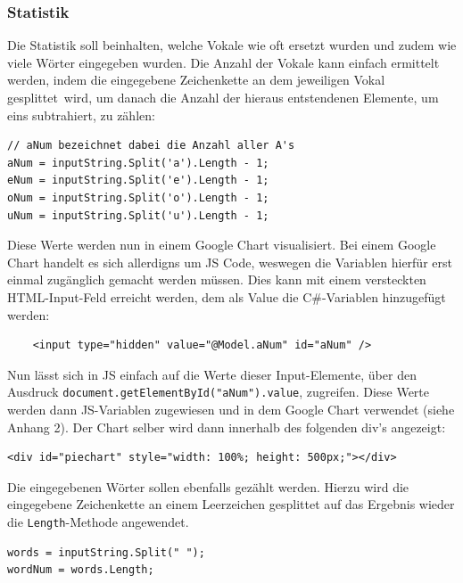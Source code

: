 \documentclass[a4paper,
12pt,
oneside]
{article}
\newcommand{\sPar}{\par\vspace*{6pt}}
\begin{document}
	 \subsubsection{Statistik}
	 Die Statistik soll beinhalten, welche Vokale wie oft ersetzt wurden und zudem wie viele Wörter eingegeben wurden. Die Anzahl der Vokale kann einfach ermittelt werden, indem die eingegebene Zeichenkette an dem jeweiligen Vokal \glqq gesplittet\grqq~wird, um danach die Anzahl der hieraus entstendenen Elemente, um eins subtrahiert, zu zählen:
	 \lstset{style=csharp}
	 \begin{lstlisting}
// aNum bezeichnet dabei die Anzahl aller A's
aNum = inputString.Split('a').Length - 1;
eNum = inputString.Split('e').Length - 1;
oNum = inputString.Split('o').Length - 1;
uNum = inputString.Split('u').Length - 1;
	 \end{lstlisting}
	 Diese Werte werden nun in einem Google Chart visualisiert. Bei einem Google Chart handelt es sich allerdigns um JS Code, weswegen die Variablen hierfür erst einmal zugänglich gemacht werden müssen. Dies kann mit einem versteckten HTML-Input-Feld erreicht werden, dem als Value die C\#-Variablen hinzugefügt werden:
	\lstset{style=cshtml}
	\begin{lstlisting}
	<input type="hidden" value="@Model.aNum" id="aNum" />
	\end{lstlisting}
	Nun lässt sich in JS einfach auf die Werte dieser Input-Elemente, über den Ausdruck \texttt{document.getElementById("{}aNum"{}).value}, zugreifen. Diese Werte werden dann JS-Variablen zugewiesen und in dem Google Chart verwendet (siehe Anhang 2). Der Chart selber wird dann innerhalb des folgenden div's angezeigt:
	\lstset{style=cshtml}
	\begin{lstlisting}
<div id="piechart" style="width: 100%; height: 500px;"></div>
	\end{lstlisting}
	\sPar
	Die eingegebenen Wörter sollen ebenfalls gezählt werden. Hierzu wird die eingegebene Zeichenkette an einem Leerzeichen gesplittet auf das Ergebnis wieder die \texttt{Length}-Methode angewendet.
	\lstset{style=csharp}
	\begin{lstlisting}
words = inputString.Split(" ");
wordNum = words.Length;
	\end{lstlisting}
	 
	 
	 
	 
	 
\end{document}
